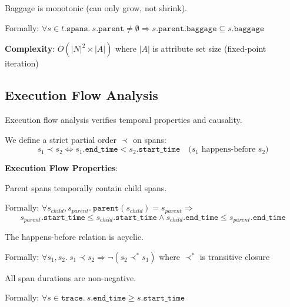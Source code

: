 \begin{property}
\label{prop:df3}
Baggage is monotonic (can only grow, not shrink).

Formally: $\forall s \in t.\texttt{spans}.\ s.\texttt{parent} \neq \emptyset \Rightarrow s.\texttt{parent}.\texttt{baggage} \subseteq s.\texttt{baggage}$
\end{property}

\textbf{Complexity}: $O(|N|^2 \times |A|)$ where $|A|$ is attribute set size (fixed-point iteration)

\subsection{Execution Flow Analysis}
\label{sec:execution-flow}

Execution flow analysis verifies temporal properties and causality.

\begin{definition}
\label{def:execution-order}
We define a strict partial order $\prec$ on spans:
\[
s_1 \prec s_2 \Leftrightarrow s_1.\texttt{end\_time} < s_2.\texttt{start\_time} \quad \text{($s_1$ happens-before $s_2$)}
\]
\end{definition}

\textbf{Execution Flow Properties}:

\begin{property}
\label{prop:ef1}
Parent spans temporally contain child spans.

Formally: $\forall s_{child}, s_{parent}.\ \texttt{parent}(s_{child}) = s_{parent} \Rightarrow$
\[
s_{parent}.\texttt{start\_time} \leq s_{child}.\texttt{start\_time} \land s_{child}.\texttt{end\_time} \leq s_{parent}.\texttt{end\_time}
\]
\end{property}

\begin{property}[Causality (EF2)]
\label{prop:ef2}
The happens-before relation is acyclic.

Formally: $\forall s_1, s_2.\ s_1 \prec s_2 \Rightarrow \neg(s_2 \prec^* s_1)$ where $\prec^*$ is transitive closure
\end{property}

\begin{property}
\label{prop:ef3}
All span durations are non-negative.

Formally: $\forall s \in \texttt{trace}.\ s.\texttt{end\_time} \geq s.\texttt{start\_time}$
\end{property}


